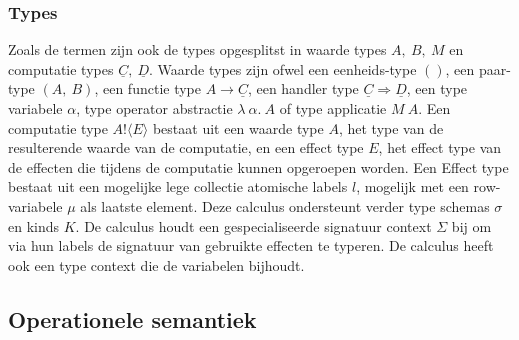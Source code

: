\subsubsection{Types}
Zoals de termen zijn ook de types opgesplitst in waarde types $A,\:B,\:M$ en computatie types $\underline{C},\:\underline{D}$. Waarde types zijn ofwel een eenheids-type $()$, een paar-type $(A,\:B)$, een functie type $A \rightarrow \underline{C}$, een handler type $\underline{C} \Rightarrow \underline{D}$, een type variabele $\alpha$, type operator abstractie $\lambda \: \alpha. \: A$ of type applicatie $M\:A$. Een computatie type $A!\langle E \rangle$ bestaat uit een waarde type $A$, het type van de resulterende waarde van de computatie, en een effect type $E$, het effect type van de effecten die tijdens de computatie kunnen opgeroepen worden. Een Effect type bestaat uit een mogelijke lege collectie atomische labels $l$, mogelijk met een row-variabele $\mu$ als laatste element.
Deze calculus ondersteunt verder type schemas $\sigma$ en kinds $K$. De calculus houdt een gespecialiseerde signatuur context $\Sigma$ bij om via hun labels de signatuur van gebruikte effecten te typeren. De calculus heeft ook een type context die de variabelen bijhoudt.  

\subsection{Operationele semantiek}

